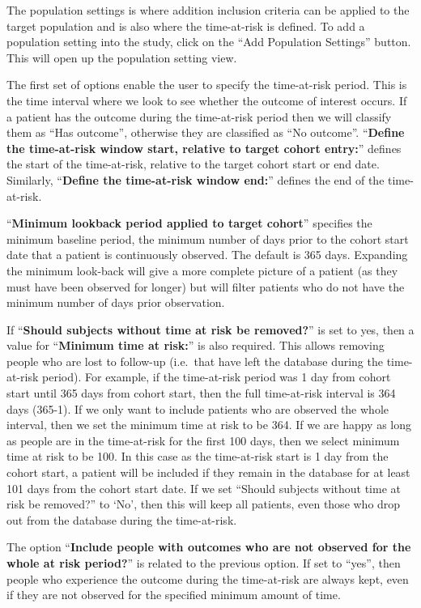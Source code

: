 \documentclass[11pt]{book}
\theoremstyle{definition}
\theoremstyle{definition}
\theoremstyle{definition}
\theoremstyle{remark}
\begin{document}
The population settings is where addition inclusion criteria can be
applied to the target population and is also where the time-at-risk is
defined. To add a population setting into the study, click on the ``Add
Population Settings'' button. This will open up the population setting
view.

The first set of options enable the user to specify the time-at-risk
period. This is the time interval where we look to see whether the
outcome of interest occurs. If a patient has the outcome during the
time-at-risk period then we will classify them as ``Has outcome'',
otherwise they are classified as ``No outcome''. ``\textbf{Define the
time-at-risk window start, relative to target cohort entry:}'' defines
the start of the time-at-risk, relative to the target cohort start or
end date. Similarly, ``\textbf{Define the time-at-risk window end:}''
defines the end of the time-at-risk.

``\textbf{Minimum lookback period applied to target cohort}'' specifies
the minimum baseline period, the minimum number of days prior to the
cohort start date that a patient is continuously observed. The default
is 365 days. Expanding the minimum look-back will give a more complete
picture of a patient (as they must have been observed for longer) but
will filter patients who do not have the minimum number of days prior
observation.

If ``\textbf{Should subjects without time at risk be removed?}'' is set
to yes, then a value for ``\textbf{Minimum time at risk:}'' is also
required. This allows removing people who are lost to follow-up
(i.e.~that have left the database during the time-at-risk period). For
example, if the time-at-risk period was 1 day from cohort start until
365 days from cohort start, then the full time-at-risk interval is 364
days (365-1). If we only want to include patients who are observed the
whole interval, then we set the minimum time at risk to be 364. If we
are happy as long as people are in the time-at-risk for the first 100
days, then we select minimum time at risk to be 100. In this case as the
time-at-risk start is 1 day from the cohort start, a patient will be
included if they remain in the database for at least 101 days from the
cohort start date. If we set ``Should subjects without time at risk be
removed?'' to `No', then this will keep all patients, even those who
drop out from the database during the time-at-risk.

The option ``\textbf{Include people with outcomes who are not observed
for the whole at risk period?}'' is related to the previous option. If
set to ``yes'', then people who experience the outcome during the
time-at-risk are always kept, even if they are not observed for the
specified minimum amount of time.
\end{document}
